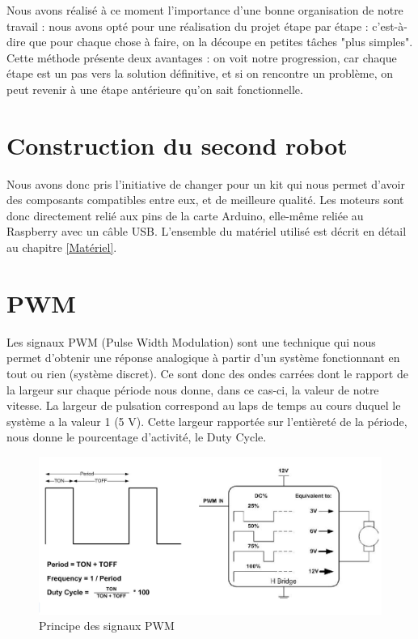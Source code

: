 \documentclass[12pt,a4paper]{report}
\begin{document}
Nous avons réalisé à ce moment l'importance d'une bonne organisation de notre travail : nous avons opté pour une réalisation du projet étape par étape : c'est-à-dire que pour chaque chose à faire, on la découpe en petites tâches "plus simples". Cette méthode présente deux avantages : on voit notre progression, car chaque étape est un pas vers la solution définitive, et si on rencontre un problème, on peut revenir à une étape antérieure qu'on sait fonctionnelle.

\section{Construction du second robot}

Nous avons donc pris l'initiative de changer pour un kit qui nous permet d'avoir des composants compatibles entre eux, et de meilleure qualité.
Les moteurs sont donc directement relié aux pins de la carte Arduino, elle-même reliée au Raspberry avec un câble USB.
L'ensemble du matériel utilisé est décrit en détail au chapitre \ref{Matériel}.

\section{PWM}

Les signaux PWM (Pulse Width Modulation) sont une technique qui nous permet d'obtenir une réponse analogique à partir d'un système fonctionnant en tout ou rien (système discret). Ce sont donc des ondes carrées dont le rapport de la largeur sur chaque période nous donne, dans ce cas-ci, la valeur de notre vitesse.
La largeur de pulsation correspond au laps de temps au cours duquel le système a la valeur 1 (5 V). Cette largeur rapportée sur l'entièreté de la période, nous donne le pourcentage d'activité, le Duty Cycle.

\begin{figure}[hf!]
\center
\includegraphics[scale=0.4]{images/PWM/totzal.png}
\caption{Principe des signaux PWM}
\label{GitHub}
\end{figure}
\end{document}
